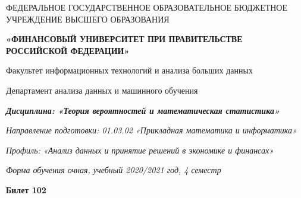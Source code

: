 \documentclass[a4paper,14pt]{article}
\begin{document}
\begin{center}
ФЕДЕРАЛЬНОЕ ГОСУДАРСТВЕННОЕ ОБРАЗОВАТЕЛЬНОЕ БЮДЖЕТНОЕ УЧРЕЖДЕНИЕ ВЫСШЕГО ОБРАЗОВАНИЯ

    \textbf{«ФИНАНСОВЫЙ УНИВЕРСИТЕТ ПРИ ПРАВИТЕЛЬСТВЕ РОССИЙСКОЙ ФЕДЕРАЦИИ»}

Факультет информационных технологий и анализа больших данных

Департамент анализа данных и машинного обучения

\textit{
	\textbf{Дисциплина: «Теория вероятностей и математическая статистика»}}

\textit{Направление подготовки: 01.03.02 «Прикладная математика и информатика»}

\textit{Профиль: «Анализ данных и принятие решений в экономике и финансах»}

\textit{Форма обучения очная, учебный 2020/2021 год, 4 семестр}

\textbf{Билет 102}

\end{center}
\end{document}

